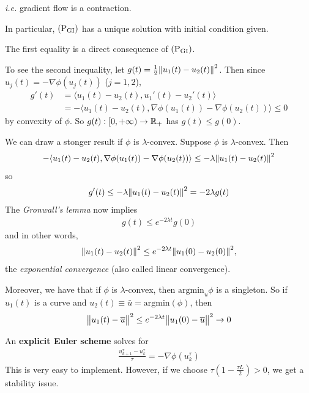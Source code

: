 \documentclass[12pt,a4paper]{article}
\newenvironment{proof}
{\begin{changemargin}{1cm}{0.5cm} 
	}%
	{\end{changemargin}
}
\newenvironment{p}
{\begin{proof} 
	}%
	{\end{proof}
}
\begin{document}
\textit{i.e.} gradient flow is a contraction.

\quad In particular, $(\text{P}_{\text{GI}})$ has a unique solution with initial condition given.
\begin{p}
\pf The first equality is a direct consequence of $(\text{P}_{\text{GI}})$.

\quad To see the second inequality, let $g(t) = \frac{1}{2} \snorms{u_1(t) - u_2(t)}{}^2$. Then since $u_j(t) = -\nabla \phi(u_j(t))$ ($j=1,2$),
\begin{align*}
g'(t) &= \langle u_1(t) - u_2(t), u_1'(t) - u_2'(t) \rangle \\
&= - \langle u_1(t)- u_2(t) , \nabla \phi(u_1(t)) - \nabla \phi(u_2(t)) \rangle \leq 0
\end{align*}
by convexity of $\phi$. So $g(t) : [0, + \infty) \rightarrow \mathbb{R}_+$ has $g(t) \leq g(0)$.

\eop
\end{p}
\s

We can draw a stonger result if $\phi$ is $\lambda$-convex. Suppose $\phi$ is $\lambda$-convex. Then 
\begin{align*}
-\langle u_1(t) - u_2(t) , \nabla \phi(u_1(t)) - \nabla \phi(u_2(t)) \rangle \leq - \lambda \snorms{u_1(t) - u_2(t)}{}^2
\end{align*}
so
\begin{align*}
g'(t) \leq - \lambda \snorms{u_1(t) - u_2(t)}{}^2 = -2\lambda g(t)
\end{align*}
The \emph{Gronwall's lemma} now implies
\begin{align*}
g(t) \leq e^{-2\lambda t}g(0)
\end{align*}
and in other words,
\begin{align*}
\snorms{u_1(t) - u_2(t)}{}^2 \leq e^{-2\lambda t} \snorms{u_1(0)- u_2(0)}{}^2,
\end{align*}
the \emph{exponential convergence} (also called linear convergence).
\s

Moreover, we have that if $\phi$ is $\lambda$-convex, then $\text{argmin}_u \phi$ is a singleton. So if $u_1(t)$ is a curve and $u_2(t) \equiv \bar{u} =\text{argmin}(\phi)$, then
\begin{align*}
\bigl\lVert u_1(t) - \overline{u}\bigr\rVert_{}^2 \leq e^{-2\lambda t}\bigl\lVert u_1(0)- \overline{u}\bigr\rVert_{}^2\rightarrow 0
\end{align*}
\s

 An \textbf{explicit Euler scheme} solves for
\begin{align*}
\frac{u^{\tau}_{k+1} - u^{\tau}_k}{\tau} = - \nabla \phi(u_k^{\tau})
\end{align*}
This is very easy to implement. However, if we choose $\tau(1- \frac{\tau L}{2})>0$, we get a stability issue.
\end{document}
